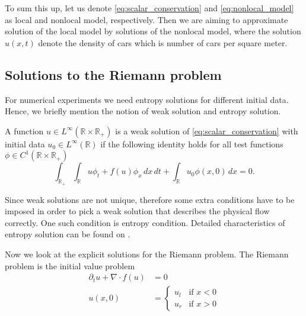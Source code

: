 To sum this up, let us denote \eqref{eq:scalar_conservation} and \eqref{eq:nonlocal_model} as local and nonlocal model, respectively. Then we are aiming
to approximate solution of the local model by solutions of the nonlocal model, where the solution $u(x,t)$ denote the density of cars which is
number of cars per square meter.

\subsection{Solutions to the Riemann problem}
For numerical experiments we need entropy solutions for different initial data. Hence, we briefly mention the notion of weak solution
and entropy solution.

\begin{definition}
    A function $u \in L^{\infty}(\mathbb{R} \times \mathbb{R_{+}})$ is a weak solution of \eqref{eq:scalar_conservation} with initial
    data $u_{0} \in L^{\infty}(\mathbb{R})$ if the following identity holds for all test functions $\phi \in C^{1}(\mathbb{R} \times \mathbb{R_{+}})$
    \begin{equation}
        \int_{\mathbb{R_{+}}}^{} \int_{\mathbb{R}}^{} {
            u \phi_{t} + f(u) \phi_{x} \,dx \, dt
        }
        + \int_{\mathbb{R}}^{} u_{0} \phi(x,0) \,dx = 0.
    \end{equation}
\end{definition}
Since weak solutions are not unique, therefore some extra conditions have to be imposed in order to pick a weak solution
that describes the physical flow correctly. One such condition is entropy condition.
Detailed characteristics of entropy solution can be found on \cite{Ulrik2015_entropy}.

Now we look at the explicit solutions for the Riemann problem.
The Riemann problem is the initial value problem
\begin{equation}
    \begin{split}
        \partial_{t} u + \nabla \cdot f(u) & = 0 \\
        u(x,0)                             & =
        \begin{cases}
            u_{l} & \text{if } x < 0 \\
            u_{r} & \text{if } x > 0
        \end{cases}
    \end{split}
\end{equation}

